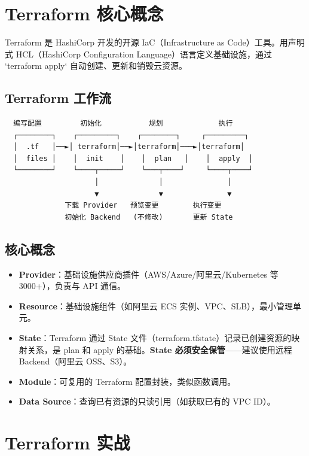 \documentclass[12pt,UTF8]{ctexbook}
\begin{document}
\section{Terraform 核心概念}
\label{sec:terraform-core}

Terraform 是 HashiCorp 开发的开源 IaC（Infrastructure as Code）工具。用声明式 HCL（HashiCorp Configuration Language）语言定义基础设施，通过 `terraform apply` 自动创建、更新和销毁云资源。

\subsection*{Terraform 工作流}

\begin{lstlisting}
  编写配置         初始化           规划             执行
  ┌────────┐    ┌─────────┐    ┌────────┐     ┌─────────┐
  │  .tf   │──►│ terraform│──►│terraform│───►│terraform│
  │  files │    │  init    │    │  plan   │    │  apply  │
  └────────┘    └────┬─────┘    └───┬────┘     └────┬────┘
                     │              │               │
                     ▼              ▼               ▼
              下载 Provider   预览变更        执行变更
              初始化 Backend   (不修改)       更新 State
\end{lstlisting}

\subsection*{核心概念}

\begin{itemize}
    \item \textbf{Provider}：基础设施供应商插件（AWS/Azure/阿里云/Kubernetes 等 3000+），负责与 API 通信。
    \item \textbf{Resource}：基础设施组件（如阿里云 ECS 实例、VPC、SLB），最小管理单元。
    \item \textbf{State}：Terraform 通过 State 文件（terraform.tfstate）记录已创建资源的映射关系，是 plan 和 apply 的基础。\textbf{State 必须安全保管}——建议使用远程 Backend（阿里云 OSS、S3）。
    \item \textbf{Module}：可复用的 Terraform 配置封装，类似函数调用。
    \item \textbf{Data Source}：查询已有资源的只读引用（如获取已有的 VPC ID）。
\end{itemize}

\section{Terraform 实战}
\label{sec:terraform-practice}
\end{document}
